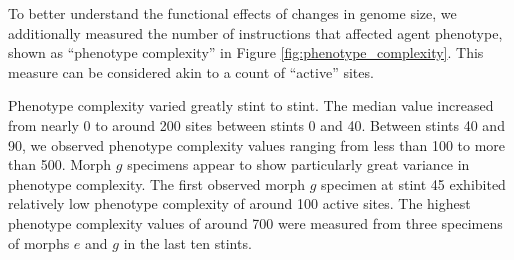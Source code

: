 To better understand the functional effects of changes in genome size, we additionally measured the number of instructions that affected agent phenotype, shown as ``phenotype complexity'' in Figure \ref{fig:phenotype_complexity}.
This measure can be considered akin to a count of ``active'' sites.

Phenotype complexity varied greatly stint to stint.
The median value increased from nearly 0 to around 200 sites between stints 0 and 40.
Between stints 40 and 90, we observed phenotype complexity values ranging from less than 100 to more than 500.
Morph $g$ specimens appear to show particularly great variance in phenotype complexity.
The first observed morph $g$ specimen at stint 45 exhibited relatively low phenotype complexity of around 100 active sites.
The highest phenotype complexity values of around 700 were measured from three specimens of morphs $e$ and $g$ in the last ten stints.
